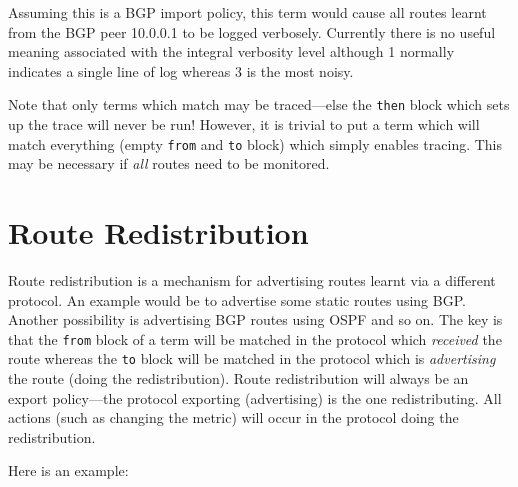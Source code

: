 Assuming this is a BGP import policy, this term would cause all routes learnt
from the BGP peer 10.0.0.1 to be logged verbosely.  Currently there is no useful
meaning associated with the integral verbosity level although 1 normally
indicates a single line of log whereas 3 is the most noisy.

Note that only terms which match may be traced---else the {\tt then} block which
sets up the trace will never be run!  However, it is trivial to put a term which
will match everything (empty {\tt from} and {\tt to} block) which simply enables
tracing.  This may be necessary if {\em all} routes need to be monitored.

\section{Route Redistribution}
Route redistribution is a mechanism for advertising routes learnt via a
different protocol.  An example would be to advertise some static routes using
BGP.  Another possibility is advertising BGP routes using OSPF and so on.  The
key is that the {\tt from} block of a term will be matched in the protocol which
{\em received} the route whereas the {\tt to} block will be matched in the
protocol which is {\em advertising} the route (doing the redistribution).
Route redistribution will always be an export policy---the protocol exporting
(advertising) is the one redistributing.  All actions (such as changing the
metric) will occur in the protocol doing the redistribution.  

Here is an example:

\noindent{}

